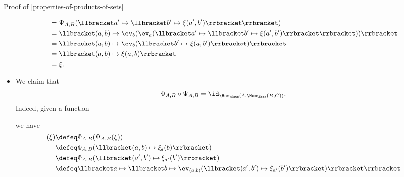 \begin{Proof}{Proof of \cref{properties-of-products-of-sets}}
\begin{itemize}
\begin{align*}
                                                 &= \Psi_{A,B}(\llbracket a'\mapsto\llbracket b'\mapsto\xi(a',b')\rrbracket\rrbracket)\\%
                                                 &= \llbracket(a,b)\mapsto\ev_{b}(\ev_{a}(\llbracket a'\mapsto\llbracket b'\mapsto\xi(a',b')\rrbracket\rrbracket))\rrbracket\\%
                                                 &= \llbracket(a,b)\mapsto\ev_{b}(\llbracket b'\mapsto\xi(a,b')\rrbracket)\rrbracket\\%
                                                 &= \llbracket(a,b)\mapsto\xi(a,b)\rrbracket\\%
                                                 &= \xi.
            \end{align*}
        \item{}We claim that
            \[
                \Phi_{A,B}\circ\Psi_{A,B}%
                =%
                \id_{\Hom_{\Sets}(A,\Hom_{\Sets}(B,C))}.%
            \]%
            Indeed, given a function
            \begin{webcompile}
                \phantom{\xi\colon}
            \end{webcompile}
            we have
            \begin{align*}
                [\Phi_{A,B}\circ\Psi_{A,B}](\xi) &\defeq \Phi_{A,B}(\Psi_{A,B}(\xi))\\%
                                                 &\defeq \Phi_{A,B}(\llbracket(a,b)\mapsto\xi_{a}(b)\rrbracket)\\%
                                                 &\defeq \Phi_{A,B}(\llbracket(a',b')\mapsto\xi_{a'}(b')\rrbracket)\\%
                                                 &\defeq \llbracket a\mapsto\llbracket b\mapsto\ev_{(a,b)}(\llbracket(a',b')\mapsto\xi_{a'}(b')\rrbracket)\rrbracket\rrbracket\\%

\end{align*}
\end{itemize}
\end{Proof}

